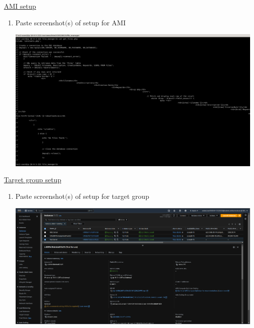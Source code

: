 \documentclass[11pt]{article}
\begin{document}
\newpage
\noindent\underline{AMI setup}

\begin{enumerate}[resume]
    \item Paste screenshot$($s$)$ of setup for AMI \\
    \vspace{-0.02mm}

    {\centering
    \includegraphics[width=5.8in]{pics/38.png}
    }
    
        
\end{enumerate}

\newpage

\noindent\underline{Target group setup}

\vspace{0.01cm}

\begin{enumerate}[resume]
    \item Paste screenshot$($s$)$ of setup for target group \\
    \vspace{-0.02mm}

    {\centering
    \includegraphics[width=5.8in]{pics/40.png}
    }    
        
\end{enumerate}
\end{document}
